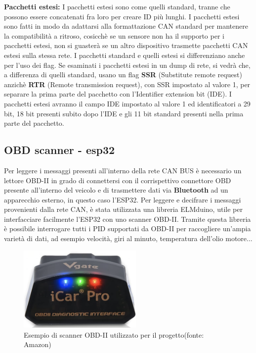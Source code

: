 \documentclass[12pt, a4paper, italian]{report}
\numberwithin{figure}{chapter}
\numberwithin{table}{chapter}
\begin{document}
\textbf{Pacchetti estesi:}
I pacchetti estesi sono come quelli standard, tranne che possono essere concatenati fra loro per creare ID più lunghi. I pacchetti estesi sono fatti in modo da adattarsi alla formattazione CAN standard per mantenere la compatibilità a ritroso, cosicchè se un sensore non ha il supporto per i pacchetti estesi, non si guasterà se un altro dispositivo trasmette pacchetti CAN estesi sulla stessa rete. I pacchetti standard e quelli estesi si differenziano anche per l'uso dei flag. Se esaminati i pacchetti estesi in un dump di rete, si vedrà che, a differenza di quelli standard, usano un flag \textbf{SSR} (Substitute remote request) anzichè \textbf{RTR} (Remote transmission request), con SSR impostato al valore 1, per separare la prima parte del pacchetto con l'Identifier extension bit (IDE). I pacchetti estesi avranno il campo IDE impostato al valore 1 ed identificatori a 29 bit, 18 bit presenti subito dopo l'IDE e gli 11 bit standard presenti nella prima parte del pacchetto.

\subsection{OBD scanner - esp32}
\label{sec:capitolo432}
Per leggere i messaggi presenti all'interno della rete CAN BUS è necessario un lettore OBD-II in grado di connettersi con il corrispettivo connettore OBD presente all'interno del veicolo e di trasmettere dati via \textbf{Bluetooth} ad un apparecchio esterno, in questo caso l'ESP32. Per leggere e decifrare i messaggi provenienti dalla rete CAN, è stata utilizzata una libreria ELMduino, utile per interfacciare facilmente l'ESP32 con uno scanner OBD-II. Tramite questa libreria è possibile interrogare tutti i PID supportati da OBD-II per raccogliere un'ampia varietà di dati, ad esempio velocità, giri al minuto, temperatura dell'olio motore...

\begin{figure}[h]
  \centering
  \includegraphics[width=6cm]{LettoreScannerOBD-II.png}
  \caption{Esempio di scanner OBD-II utilizzato per il progetto\protect\footnotemark (fonte: Amazon)}
  \label{fig:scannerOBD-II}
\end{figure}
\end{document}
